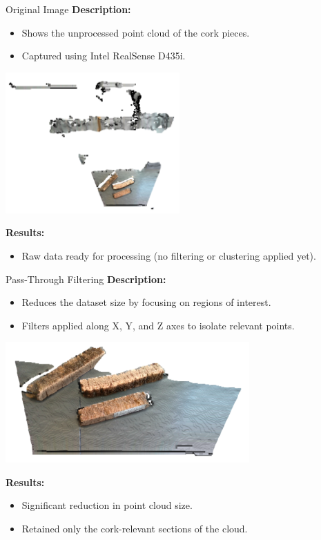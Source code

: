 \documentclass[10pt]{beamer}
\begin{document}
	\begin{frame}{Original Image}
		\textbf{Description:}
		\begin{itemize}
			\item Shows the unprocessed point cloud of the cork pieces.
			\item Captured using Intel RealSense D435i.
		\end{itemize}
		\begin{center}
			\includegraphics[width=0.5\textwidth]{img/original.png}
		\end{center}
		\textbf{Results:}
		\begin{itemize}
			\item Raw data ready for processing (no filtering or clustering applied yet).
		\end{itemize}
	\end{frame}
	
	\begin{frame}{Pass-Through Filtering}
		\textbf{Description:}
		\begin{itemize}
			\item Reduces the dataset size by focusing on regions of interest.
			\item Filters applied along X, Y, and Z axes to isolate relevant points.
		\end{itemize}
		\begin{center}
			\includegraphics[width=0.7\textwidth]{img/passabanda.png}
		\end{center}
		\textbf{Results:}
		\begin{itemize}
			
			\item Significant reduction in point cloud size.
			\item Retained only the cork-relevant sections of the cloud.
		\end{itemize}
		\end{frame}
	
\end{document}
